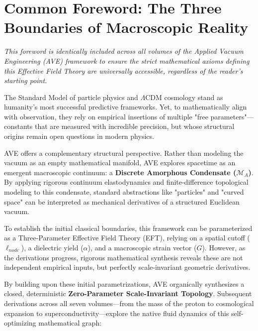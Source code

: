 \chapter*{Common Foreword: The Three Boundaries of Macroscopic Reality}

\textit{This foreword is identically included across all volumes of the Applied Vacuum Engineering (AVE) framework to ensure the strict mathematical axioms defining this Effective Field Theory are universally accessible, regardless of the reader's starting point.}

\vspace{1em}
\noindent The Standard Model of particle physics and $\Lambda$CDM cosmology stand as humanity's most successful predictive frameworks. Yet, to mathematically align with observation, they rely on empirical insertions of multiple "free parameters"—constants that are measured with incredible precision, but whose structural origins remain open questions in modern physics. 

AVE offers a complementary structural perspective. Rather than modeling the vacuum as an empty mathematical manifold, AVE explores spacetime as an emergent macroscopic continuum: a \textbf{Discrete Amorphous Condensate ($\mathcal{M}_A$)}. By applying rigorous continuum elastodynamics and finite-difference topological modeling to this condensate, standard abstractions like "particles" and "curved space" can be interpreted as mechanical derivatives of a structured Euclidean vacuum.

To establish the initial classical boundaries, this framework can be parameterized as a Three-Parameter Effective Field Theory (EFT), relying on a spatial cutoff ($\ell_{node}$), a dielectric yield ($\alpha$), and a macroscopic strain vector ($G$). However, as the derivations progress, rigorous mathematical synthesis reveals these are not independent empirical inputs, but perfectly scale-invariant geometric derivatives. 

By building upon these initial parametrizations, AVE organically synthesizes a closed, deterministic \textbf{Zero-Parameter Scale-Invariant Topology}. Subsequent derivations across all seven volumes—from the mass of the proton to cosmological expansion to superconductivity—explore the native fluid dynamics of this self-optimizing mathematical graph:

